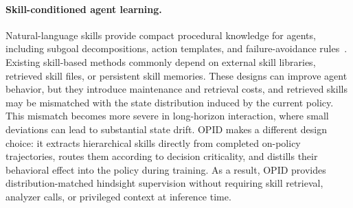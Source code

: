 \paragraph{Skill-conditioned agent learning.}
Natural-language skills provide compact procedural knowledge for agents, including subgoal decompositions, action templates, and failure-avoidance rules~\citep{lu2026skill0,wang2026skillsd,lu2026sdar,wu2026maestro}. Existing skill-based methods commonly depend on external skill libraries, retrieved skill files, or persistent skill memories. These designs can improve agent behavior, but they introduce maintenance and retrieval costs, and retrieved skills may be mismatched with the state distribution induced by the current policy. This mismatch becomes more severe in long-horizon interaction, where small deviations can lead to substantial state drift. OPID makes a different design choice: it extracts hierarchical skills directly from completed on-policy trajectories, routes them according to decision criticality, and distills their behavioral effect into the policy during training. As a result, OPID provides distribution-matched hindsight supervision without requiring skill retrieval, analyzer calls, or privileged context at inference time.